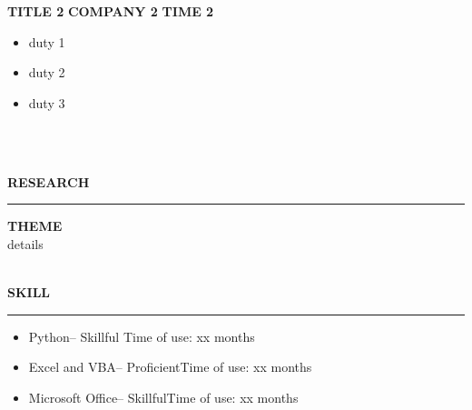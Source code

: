 \documentclass{article}
\theoremstyle{plain}
\begin{document}
\begin{itemize}
{{{{{\begin{flushleft}
\MakeUppercase{\Large\textbf{internship}} %
\end{flushleft}
\rule[4pt]{18cm}{0.5pt} %


\MakeUppercase{\small\textbf{title 1}}  %
\hfill
\MakeUppercase{\small\textbf{company1}}
\hfill
\MakeUppercase{\small\textbf{time 1}}
\begin{itemize}
	\item{\normalsize{duty 1}}
	\item{\normalsize{duty 2}}
\end{itemize}


\MakeUppercase{\small\textbf{title 2}} %
\hfill
\MakeUppercase{\small\textbf{company 2}}
\hfill
\MakeUppercase{\small\textbf{time 2}}

\begin{itemize}
	\item{\normalsize{duty 1}}
	\item{\normalsize{duty 2}}
	\item{\normalsize{duty 3}}
	
\end{itemize}

\\\hspace*{\fill}\\

\begin{flushleft}
\MakeUppercase{\Large\textbf{research}}  %
\end{flushleft}  
\rule[4pt]{18cm}{0.5pt} %

\MakeUppercase{\small\textbf{theme}}
\\{details}
\\\hspace*{\fill}\\

\begin{flushleft}
\MakeUppercase{\Large\textbf{skill}} %
\end{flushleft}
\rule[4pt]{18cm}{0.5pt} %

\begin{itemize}
	\item{\normalsize{Python-- Skillful}\hfill{ Time of use: xx months}}
	\item{\normalsize{Excel and VBA-- Proficient}\hfill{Time of use: xx months}}
	\item{\normalsize{Microsoft Office-- Skillful}\hfill{Time of use: xx months}}	
\end{itemize}
\end{document}
